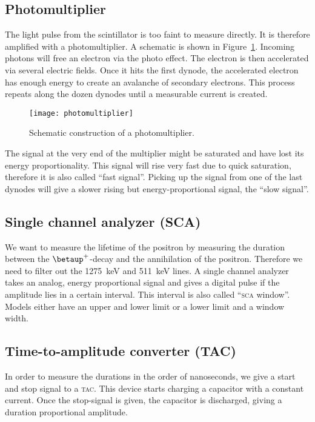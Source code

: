 \documentclass[11pt, english, fleqn, DIV=15, headinclude, BCOR=2cm]{scrreprt}
\begin{document}
\subsection{Photomultiplier}

The light pulse from the scintillator is too faint to measure directly. It is
therefore amplified with a photomultiplier. A schematic is shown in
Figure~\ref{fig:photomultiplier}. Incoming photons will free an electron via
the photo effect. The electron is then accelerated via several electric fields.
Once it hits the first dynode, the accelerated electron has enough energy to
create an avalanche of secondary electrons. This process repeats along the
dozen dynodes until a measurable current is created.

\begin{figure}
    \centering
    \texttt{[image: photomultiplier]}
    \caption{%
        Schematic construction of a photomultiplier.
    }
    \label{fig:photomultiplier}
\end{figure}

The signal at the very end of the multiplier might be saturated and have lost
its energy proportionality. This signal will rise very fast due to quick
saturation, therefore it is also called \enquote{fast signal}. Picking up the
signal from one of the last dynodes will give a slower rising but
energy-proportional signal, the \enquote{slow signal}.

\subsection{Single channel analyzer (SCA)}

We want to measure the lifetime of the positron by measuring the duration
between the $\betaup^+$-decay and the annihilation of the positron. Therefore we
need to filter out the \SI{1275}{\kilo\electronvolt} and
\SI{511}{\kilo\electronvolt} lines. A single channel analyzer takes an analog,
energy proportional signal and gives a digital pulse if the amplitude lies in a
certain interval. This interval is also called \enquote{\textsc{sca} window}. Models
either have an upper and lower limit or a lower limit and a window width.

\subsection{Time-to-amplitude converter (TAC)}

In order to measure the durations in the order of nanoseconds, we give a start
and stop signal to a \textsc{tac}\@. This device starts charging a capacitor
with a constant current. Once the stop-signal is given, the capacitor is
discharged, giving a duration proportional amplitude.
\end{document}

